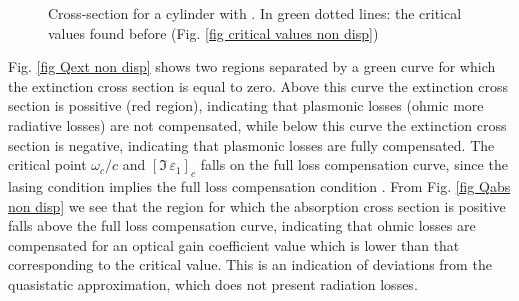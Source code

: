 \documentclass[9pt,twocolumn,twoside]{osajnl}
\begin{document}

\begin{figure}[t]
    \centering
    \captionsetup[subfigure]{justification=centering}
    \captionsetup[subfigure]{justification=centering}
    \captionsetup[subfigure]{justification=centering}
    \caption{Cross-section for a cylinder with \threeNonDisp. In green dotted lines: the critical values found before (Fig. \ref{fig critical values non disp})}
    \label{fig cross sections nondisp}
\end{figure}



Fig. \ref{fig Qext non disp} shows two regions separated by a  green  curve  for  which  the  extinction  cross  section  is  equal to zero. Above this curve the extinction cross section is possitive (red  region),  indicating  that  plasmonic  losses  (ohmic  more radiative losses) are not compensated, while below this curve the extinction cross section is negative, indicating  that  plasmonic losses are fully compensated. 
The critical point $\omega_c/c$ and $[\Im\,\varepsilon_{1}]_c$ falls on the full loss compensation curve, since the lasing condition implies the full loss compensation condition \cite{Rev1}. 
From Fig. \ref{fig Qabs non disp} we see that the region for which the absorption cross section is positive falls above the full loss compensation curve, indicating that ohmic losses are compensated for an optical gain coefficient value which is lower than that corresponding to the critical value. This is an indication of deviations from the quasistatic approximation, which does not present radiation losses. %
\end{document}
